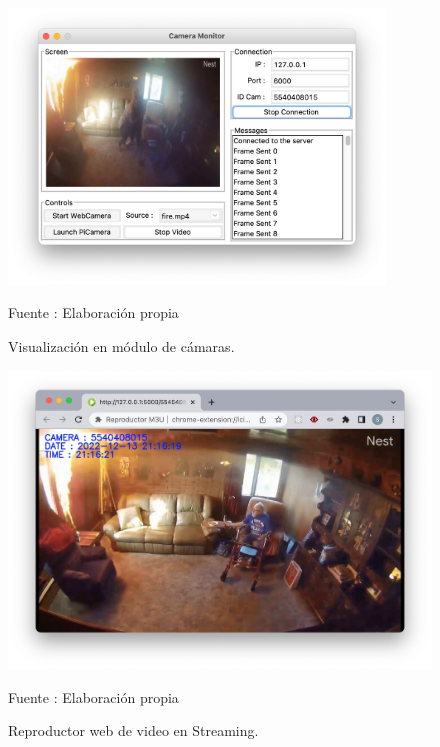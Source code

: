 \begin{figure}[H]
    \begin{center}
        \includegraphics[width=10cm]{img/capitulo_6/stream.png}
        \caption{Visualización en módulo de cámaras.}
        Fuente : Elaboración propia
    \end{center}
\end{figure}

\begin{figure}[H]
    \begin{center}
        \includegraphics[width=15cm]{img/capitulo_6/stream_web.png}
        \caption{Reproductor web de video en Streaming.}
        Fuente : Elaboración propia
    \end{center}
\end{figure}